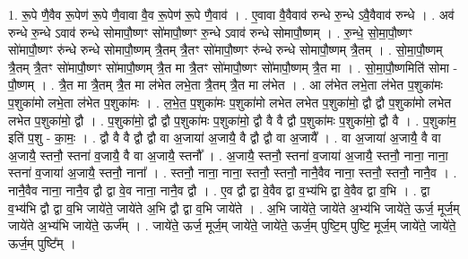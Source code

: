 \documentclass[17pt]{extarticle}
\begin{document}
1. रू॒पे णै॒वैव रू॒पेण॑ रू॒पे णै॒वावा वै॒व रू॒पेण॑ रू॒पे णै॒वाव॑ । . ए॒वावा वै॒वैवाव॑ रुन्धे रु॒न्धे ऽवै॒वैवाव॑ रुन्धे । . अव॑ रुन्धे रु॒न्धे ऽवाव॑ रुन्धे सोमापौ॒ष्णꣳ सो॑मापौ॒ष्णꣳ रु॒न्धे ऽवाव॑ रुन्धे सोमापौ॒ष्णम् । . रु॒न्धे॒ सो॒मा॒पौ॒ष्णꣳ सो॑मापौ॒ष्णꣳ रु॑न्धे रुन्धे सोमापौ॒ष्णम् त्रै॒तम् त्रै॒तꣳ सो॑मापौ॒ष्णꣳ रु॑न्धे रुन्धे सोमापौ॒ष्णम् त्रै॒तम् । . सो॒मा॒पौ॒ष्णम् त्रै॒तम् त्रै॒तꣳ सो॑मापौ॒ष्णꣳ सो॑मापौ॒ष्णम् त्रै॒त मा त्रै॒तꣳ सो॑मापौ॒ष्णꣳ सो॑मापौ॒ष्णम् त्रै॒त मा । . सो॒मा॒पौ॒ष्णमिति॑ सोमा - पौ॒ष्णम् । . त्रै॒त मा त्रै॒तम् त्रै॒त मा ल॑भेत लभे॒ता त्रै॒तम् त्रै॒त मा ल॑भेत । . आ ल॑भेत लभे॒ता ल॑भेत प॒शुका॑मः प॒शुका॑मो लभे॒ता ल॑भेत प॒शुका॑मः । . ल॒भे॒त॒ प॒शुका॑मः प॒शुका॑मो लभेत लभेत प॒शुका॑मो॒ द्वौ द्वौ प॒शुका॑मो लभेत लभेत प॒शुका॑मो॒ द्वौ । . प॒शुका॑मो॒ द्वौ द्वौ प॒शुका॑मः प॒शुका॑मो॒ द्वौ वै वै द्वौ प॒शुका॑मः प॒शुका॑मो॒ द्वौ वै । . प॒शुका॑म॒ इति॑ प॒शु - का॒मः॒ । . द्वौ वै वै द्वौ द्वौ वा अ॒जाया॑ अ॒जायै॒ वै द्वौ द्वौ वा अ॒जायै᳚ । . वा अ॒जाया॑ अ॒जायै॒ वै वा अ॒जायै॒ स्तनौ॒ स्तना॑ व॒जायै॒ वै वा अ॒जायै॒ स्तनौ᳚ । . अ॒जायै॒ स्तनौ॒ स्तना॑ व॒जाया॑ अ॒जायै॒ स्तनौ॒ नाना॒ नाना॒ स्तना॑ व॒जाया॑ अ॒जायै॒ स्तनौ॒ नाना᳚ । . स्तनौ॒ नाना॒ नाना॒ स्तनौ॒ स्तनौ॒ नानै॒वैव नाना॒ स्तनौ॒ स्तनौ॒ नानै॒व । . नानै॒वैव नाना॒ नानै॒व द्वौ द्वा वे॒व नाना॒ नानै॒व द्वौ । . ए॒व द्वौ द्वा वे॒वैव द्वा व॒भ्य॑भि द्वा वे॒वैव द्वा व॒भि । . द्वा व॒भ्य॑भि द्वौ द्वा व॒भि जाये॑ते॒ जाये॑ते अ॒भि द्वौ द्वा व॒भि जाये॑ते । . अ॒भि जाये॑ते॒ जाये॑ते अ॒भ्य॑भि जाये॑ते॒ ऊर्ज॒ मूर्ज॒म् जाये॑ते अ॒भ्य॑भि जाये॑ते॒ ऊर्ज᳚म् । . जाये॑ते॒ ऊर्ज॒ मूर्ज॒म् जाये॑ते॒ जाये॑ते॒ ऊर्ज॒म् पुष्टि॒म् पुष्टि॒ मूर्ज॒म् जाये॑ते॒ जाये॑ते॒ ऊर्ज॒म् पुष्टि᳚म् । \newline
\end{document}
